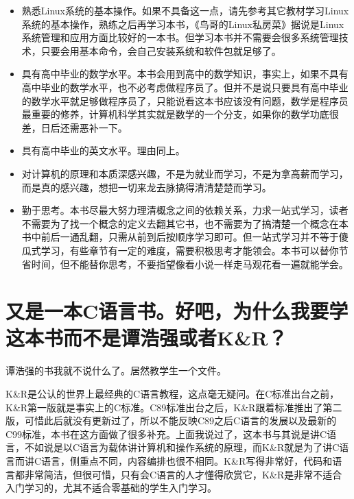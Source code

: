 \begin{itemize}

\item 熟悉Linux系统的基本操作。如果不具备这一点，请先参考其它教材学习Linux系统的基本操作，熟练之后再学习本书，《鸟哥的Linux私房菜》据说是Linux系统管理和应用方面比较好的一本书。但学习本书并不需要会很多系统管理技术，只要会用基本命令，会自己安装系统和软件包就足够了。

\item 具有高中毕业的数学水平。本书会用到高中的数学知识，事实上，如果不具有高中毕业的数学水平，也不必考虑做程序员了。但并不是说只要具有高中毕业的数学水平就足够做程序员了，只能说看这本书应该没有问题，数学是程序员最重要的修养，计算机科学其实就是数学的一个分支，如果你的数学功底很差，日后还需恶补一下。

\item 具有高中毕业的英文水平。理由同上。

\item 对计算机的原理和本质深感兴趣，不是为就业而学习，不是为拿高薪而学习，而是真的感兴趣，想把一切来龙去脉搞得清清楚楚而学习。

\item 勤于思考。本书尽最大努力理清概念之间的依赖关系，力求一站式学习，读者不需要为了找一个概念的定义去翻其它书，也不需要为了搞清楚一个概念在本书中前后一通乱翻，只需从前到后按顺序学习即可。但一站式学习并不等于傻瓜式学习，有些章节有一定的难度，需要积极思考才能领会。本书可以替你节省时间，但不能替你思考，不要指望像看小说一样走马观花看一遍就能学会。
\end{itemize}

\section*{又是一本C语言书。好吧，为什么我要学这本书而不是谭浩强或者K\&R？}
%


谭浩强的书我就不说什么了。居然教学生一个文件。



K\&R是公认的世界上最经典的C语言教程，这点毫无疑问。在C标准出台之前，K\&R第一版就是事实上的C标准。C89标准出台之后，K\&R跟着标准推出了第二版，可惜此后就没有更新过了，所以不能反映C89之后C语言的发展以及最新的C99标准，本书在这方面做了很多补充。上面我说过了，这本书与其说是讲C语言，不如说是以C语言为载体讲计算机和操作系统的原理，而K\&R就是为了讲C语言而讲C语言，侧重点不同，内容编排也很不相同。K\&R写得非常好，代码和语言都非常简洁，但很可惜，只有会C语言的人才懂得欣赏它，K\&R是非常不适合入门学习的，尤其不适合零基础的学生入门学习。



